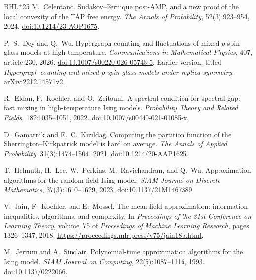 \documentclass[10pt]{article}
\theoremstyle{plain}
\theoremstyle{definition}
\theoremstyle{remark}
\begin{document}
\begin{thebibliography}{BHL$^+$25}
M.~Celentano.
\newblock Sudakov--Fernique post-AMP, and a new proof of the local convexity of the TAP free energy.
\newblock \emph{The Annals of Probability}, 52(3):923--954, 2024.
\newblock \href{https://doi.org/10.1214/23-AOP1675}{doi:10.1214/23-AOP1675}.

P.~S.~Dey and Q.~Wu.
\newblock Hypergraph counting and fluctuations of mixed $p$-spin glass models at high temperature.
\newblock \emph{Communications in Mathematical Physics}, 407, article 230, 2026.
\newblock \href{https://doi.org/10.1007/s00220-026-05748-5}{doi:10.1007/s00220-026-05748-5}.
\newblock Earlier version, titled \emph{Hypergraph counting and mixed $p$-spin glass models under replica symmetry}:
\href{https://arxiv.org/abs/2212.14571v2}{arXiv:2212.14571v2}.

R.~Eldan, F.~Koehler, and O.~Zeitouni.
\newblock A spectral condition for spectral gap: fast mixing in high-temperature Ising models.
\newblock \emph{Probability Theory and Related Fields}, 182:1035--1051, 2022.
\newblock \href{https://doi.org/10.1007/s00440-021-01085-x}{doi:10.1007/s00440-021-01085-x}.

D.~Gamarnik and E.~C.~K\i z\i lda\u{g}.
\newblock Computing the partition function of the Sherrington--Kirkpatrick model is hard on average.
\newblock \emph{The Annals of Applied Probability}, 31(3):1474--1504, 2021.
\newblock \href{https://doi.org/10.1214/20-AAP1625}{doi:10.1214/20-AAP1625}.

T.~Helmuth, H.~Lee, W.~Perkins, M.~Ravichandran, and Q.~Wu.
\newblock Approximation algorithms for the random-field Ising model.
\newblock \emph{SIAM Journal on Discrete Mathematics}, 37(3):1610--1629, 2023.
\newblock \href{https://doi.org/10.1137/21M1467389}{doi:10.1137/21M1467389}.

V.~Jain, F.~Koehler, and E.~Mossel.
\newblock The mean-field approximation: information inequalities, algorithms, and complexity.
\newblock In \emph{Proceedings of the 31st Conference on Learning Theory}, volume~75 of \emph{Proceedings of Machine Learning Research}, pages 1326--1347, 2018.
\newblock \url{https://proceedings.mlr.press/v75/jain18b.html}.

M.~Jerrum and A.~Sinclair.
\newblock Polynomial-time approximation algorithms for the Ising model.
\newblock \emph{SIAM Journal on Computing}, 22(5):1087--1116, 1993.
\newblock \href{https://doi.org/10.1137/0222066}{doi:10.1137/0222066}.


\end{thebibliography}
\end{document}
